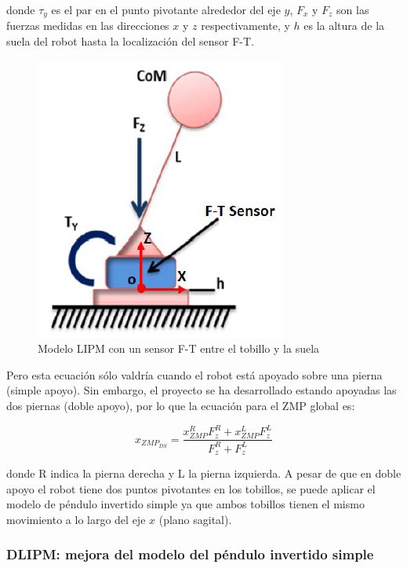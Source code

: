 donde $\tau_y$ es el par en el punto pivotante alrededor del eje $y$, $F_x$ y $F_z$ son las fuerzas medidas en las direcciones $x$ y $z$ respectivamente, y $h$ es la altura de la suela del robot hasta la localización del sensor F-T.

\begin{figure}[H]
\centering
\includegraphics[scale=0.8]{imagenes/apartado_4/44_LIPM_TEO}
\caption{Modelo LIPM con un sensor F-T entre el tobillo y la suela \cite{ref26}}
\label{figura44}
\end{figure}

Pero esta ecuación sólo valdría cuando el robot está apoyado sobre una pierna (simple apoyo). Sin embargo, el proyecto se ha desarrollado estando apoyadas las dos piernas (doble apoyo), por lo que la ecuación para el ZMP global es:


\begin{equation}
x_{ZMP_{DS}}=\frac{x_{ZMP}^{R}F_{z}^{R}+x_{ZMP}^{L}F_{z}^{L}}{F_{z}^{R}+F_{z}^{L}}
\label{ec423}
\end{equation}

donde R indica la pierna derecha y L la pierna izquierda. A pesar de que en doble apoyo el robot tiene dos puntos pivotantes en los tobillos, se puede aplicar el modelo de péndulo invertido simple ya que ambos tobillos tienen el mismo movimiento a lo largo del eje $x$ (plano sagital).

\subsubsection{DLIPM: mejora del modelo del péndulo invertido simple}\label{definicionDLIPM}

